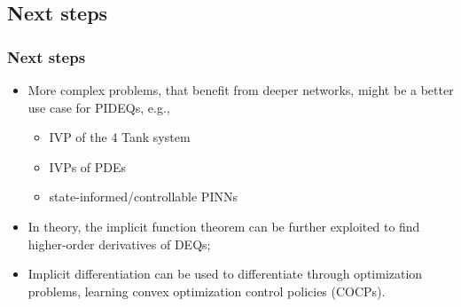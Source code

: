 \documentclass[t]{beamer}
\begin{document}
\subsection{Next steps}

\begin{frame}
    \frametitle{Next steps}
    \begin{itemize}[label={\textbullet}]
	\item<1-> More complex problems, that benefit from deeper networks, might be a better use case for PIDEQs, e.g., 
	    \begin{itemize}[label={\textbullet}]
	        \item IVP of the 4 Tank system \cite{johansson_quadruple-tank_2000-1}
		\item IVPs of PDEs \cite{Raissi2019}
		\item state-informed/controllable PINNs \cite{Antonelo2021,Arnold2021}
	    \end{itemize}
	\item<2-> In theory, the implicit function theorem can be further exploited to find higher-order derivatives of DEQs;
	\item<3-> Implicit differentiation can be used to differentiate through optimization problems, learning convex optimization control policies (COCPs).
    \end{itemize}
\end{frame}
\end{document}
